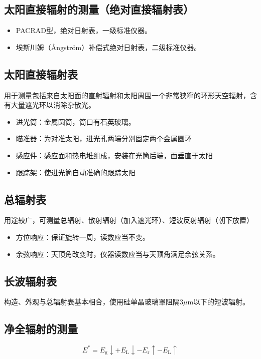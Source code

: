 \documentclass[UTF8,11pt]{ctexbook}
\begin{document}
\subsection{太阳直接辐射的测量（绝对直接辐射表）}
\begin{itemize}
    \item PACRAD型，绝对日射表，一级标准仪器。
    \item 埃斯川姆（\r{A}ngstr\"{o}m）补偿式绝对日射表，二级标准仪器。
\end{itemize}

\subsection{太阳直接辐射表}

用于测量包括来自太阳面的直射辐射和太阳周围一个非常狭窄的环形天空辐射，含有大量遮光环以消除杂散光。
\begin{itemize}
    \item 进光筒：金属圆筒，筒口有石英玻璃。
    \item 瞄准器：为对准太阳，进光孔两端分别固定两个金属圆环
    \item 感应件：感应面和热电堆组成，安装在光筒后端，面垂直于太阳
    \item 跟踪架：使进光筒自动准确的跟踪太阳
\end{itemize}

\subsection{总辐射表}

用途较广，可测量总辐射、散射辐射（加入遮光环）、短波反射辐射（朝下放置）
\begin{itemize}
    \item 方位响应：保证旋转一周，读数应当不变。
    \item 余弦响应：天顶角改变时，仪器读数应当与天顶角满足余弦关系。
\end{itemize}

\subsection{长波辐射表}

构造、外观与总辐射表基本相合，使用硅单晶玻璃罩阻隔\(3\mu\mathrm{m}\)以下的短波辐射。

\subsection{净全辐射的测量}
\[
E^*=E_\mathrm{g}\downarrow+E_\mathrm{L}\downarrow-E_\mathrm{r}\uparrow-E_\mathrm{L}\uparrow
\]
\end{document}
